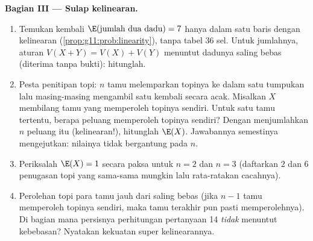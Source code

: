 \begin{problem}
\medskip
\noindent\textbf{Bagian III --- Sulap kelinearan.}
\begin{enumerate}[resume]
  \item Temukan kembali $\E(\text{jumlah dua dadu}) = 7$ hanya dalam
        satu baris dengan kelinearan (\cref{prop:g11:prob:linearity}), tanpa
        tabel $36$ sel. Untuk \emph{} jumlahnya,
        aturan $V(X + Y) = V(X) + V(Y)$ menuntut dadunya saling
        bebas (diterima tanpa bukti): hitunglah.
  \item Pesta penitipan topi: $n$ tamu melemparkan topinya ke dalam
        satu tumpukan lalu masing-masing mengambil satu kembali secara acak.
        Misalkan $X$ membilang tamu yang memperoleh topinya sendiri. Untuk satu
        tamu tertentu, berapa peluang memperoleh topinya sendiri? Dengan
        menjumlahkan $n$ peluang itu (kelinearan!), hitunglah $\E(X)$.
        Jawabannya semestinya mengejutkan: nilainya tidak bergantung pada $n$.
  \item Periksalah $\E(X) = 1$ secara paksa untuk $n = 2$ dan
        $n = 3$ (daftarkan $2$ dan $6$ penugasan topi yang sama-sama mungkin
        lalu rata-ratakan cacahnya).
  \item Perolehan topi para tamu jauh dari saling bebas (jika
        $n - 1$ tamu memperoleh topinya sendiri, maka tamu terakhir pun
        pasti memperolehnya). Di bagian mana persisnya perhitungan pertanyaan 14
        \emph{tidak} menuntut kebebasan? Nyatakan kekuatan super kelinearannya.
\end{enumerate}


\end{problem}
